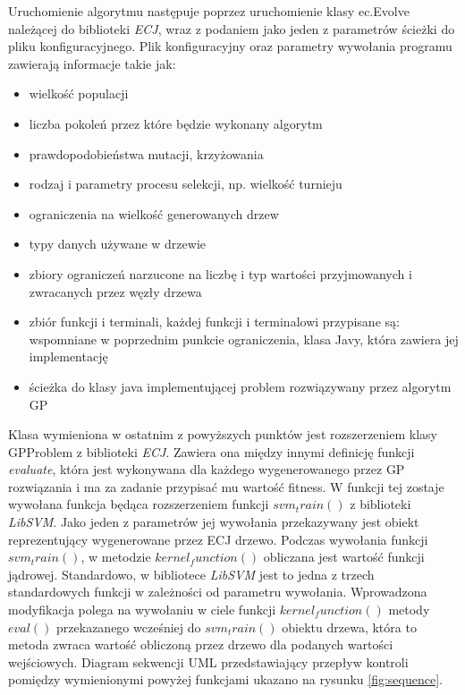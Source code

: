 Uruchomienie algorytmu następuje poprzez uruchomienie klasy ec.Evolve należącej do biblioteki \emph{ECJ}, wraz z podaniem jako jeden z parametrów ścieżki do pliku konfiguracyjnego.
Plik konfiguracyjny oraz parametry wywołania programu zawierają informacje takie jak:
\begin{itemize}
	\item wielkość populacji
	\item liczba pokoleń przez które będzie wykonany algorytm
	\item prawdopodobieństwa mutacji, krzyżowania
	\item rodzaj i parametry procesu selekcji, np. wielkość turnieju
	\item ograniczenia na wielkość generowanych drzew
	\item typy danych używane w drzewie
	\item zbiory ograniczeń narzucone na liczbę i typ wartości przyjmowanych i zwracanych przez węzły drzewa
	\item zbiór funkcji i terminali, każdej funkcji i terminalowi przypisane są: wspomniane w poprzednim punkcie ograniczenia, klasa Javy, która zawiera jej implementację
	\item ścieżka do klasy java implementującej problem rozwiązywany przez algorytm GP
\end{itemize}

Klasa wymieniona w ostatnim z powyższych punktów jest rozszerzeniem klasy GPProblem z biblioteki \emph{ECJ}. 
Zawiera ona między innymi definicję funkcji \emph{evaluate}, która  jest wykonywana dla każdego wygenerowanego przez GP rozwiązania i ma za zadanie przypisać mu wartość fitness. W funkcji tej zostaje wywołana funkcja będąca rozszerzeniem funkcji $ svm_train() $ z biblioteki \emph{LibSVM}. 
Jako jeden z parametrów jej wywołania przekazywany jest obiekt reprezentujący wygenerowane przez ECJ drzewo. 
Podczas wywołania funkcji $ svm_train() $, w metodzie $ kernel_function() $ obliczana jest wartość funkcji jądrowej. Standardowo, w bibliotece \emph{LibSVM} jest to jedna z trzech standardowych funkcji w zależności od parametru wywołania. 
Wprowadzona modyfikacja polega na wywołaniu w ciele funkcji $ kernel_function() $ metody $ eval() $ przekazanego wcześniej do $ svm_train() $ obiektu drzewa, która to metoda zwraca wartość obliczoną przez drzewo dla podanych wartości wejściowych.
Diagram sekwencji UML przedstawiający przepływ kontroli pomiędzy wymienionymi powyżej funkcjami ukazano na rysunku \ref{fig:sequence}.

